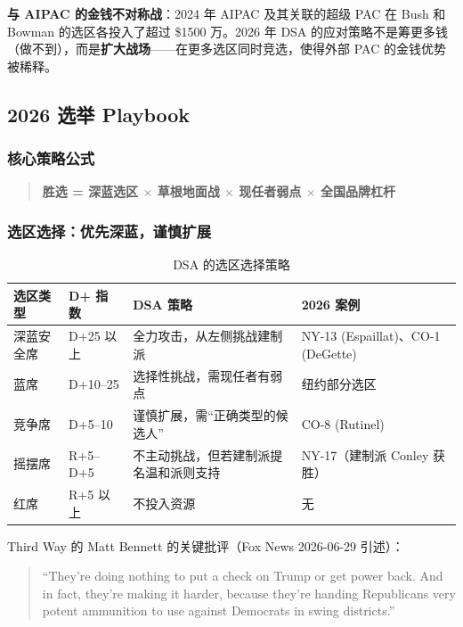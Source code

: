\documentclass[12pt,a4paper]{ctexart}
\begin{document}
\textbf{与 AIPAC 的金钱不对称战}：2024 年 AIPAC 及其关联的超级 PAC 在 Bush 和 Bowman 的选区各投入了超过 \$1500 万。2026 年 DSA 的应对策略不是筹更多钱（做不到），而是\textbf{扩大战场}——在更多选区同时竞选，使得外部 PAC 的金钱优势被稀释。

\subsection{2026 选举 Playbook}

\subsubsection{核心策略公式}

\begin{quote}
\textbf{胜选 = 深蓝选区 $\times$ 草根地面战 $\times$ 现任者弱点 $\times$ 全国品牌杠杆}
\end{quote}

\subsubsection{选区选择：优先深蓝，谨慎扩展}

\begin{table}[h]
\centering
\caption{DSA 的选区选择策略}
\begin{tabular}{@{}lp{2.6cm}p{5.4cm}p{5.2cm}@{}}
\toprule
\textbf{选区类型} & \textbf{D+ 指数} & \textbf{DSA 策略} & \textbf{2026 案例} \\
\midrule
深蓝安全席 & D+25 以上 & 全力攻击，从左侧挑战建制派 & NY-13 (Espaillat)、CO-1 (DeGette) \\
蓝席 & D+10--25 & 选择性挑战，需现任者有弱点 & 纽约部分选区 \\
竞争席 & D+5--10 & 谨慎扩展，需``正确类型的候选人'' & CO-8 (Rutinel) \\
摇摆席 & R+5--D+5 & 不主动挑战，但若建制派提名温和派则支持 & NY-17（建制派 Conley 获胜） \\
红席 & R+5 以上 & 不投入资源 & 无 \\
\bottomrule
\end{tabular}
\end{table}

Third Way 的 Matt Bennett 的关键批评（Fox News 2026-06-29 引述）：

\begin{quote}
``They're doing nothing to put a check on Trump or get power back. And in fact, they're making it harder, because they're handing Republicans very potent ammunition to use against Democrats in swing districts.''
\end{quote}
\end{document}
